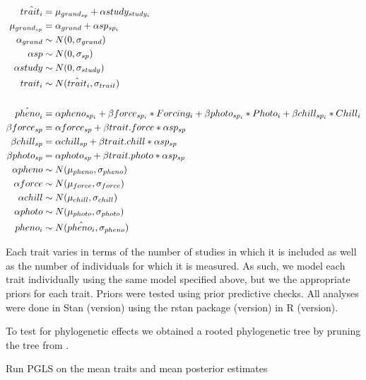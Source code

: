 \documentclass{article}\usepackage[]{graphicx}\usepackage[]{color}
\begin{document}
\begin{align*}
\hat{trait_i} &= \mu_{grand_{sp}} + \alpha study_{study_i} \\
\mu_{grand_{sp}} &= \alpha_{grand} + \alpha sp_{sp_i} \\
\alpha_{grand}  & \sim N(0, \sigma_{grand})\\
\alpha sp & \sim N(0, \sigma_{sp}) \\
\alpha study& \sim N(0, \sigma_{study}) \\
trait_i & \sim N(\hat{trait}_i, \sigma_{trait}) \\
\vspace{1ex}\\
\hat{pheno}_i  &= \alpha pheno_{sp_i} + \beta force_{sp_i} * Forcing_{i} + \beta photo_{sp_i}  * Photo_{i} + \beta chill_{sp_i} * Chill_{i} \\
\beta force_{sp} &= \alpha force_{sp} + \beta trait.force * \alpha sp_{sp}\\
\beta chill_{sp} &= \alpha chill_{sp} + \beta trait.chill * \alpha sp_{sp}\\
\beta photo_{sp} &= \alpha photo_{sp} + \beta trait.photo * \alpha sp_{sp}\\
\alpha pheno & \sim N(\mu_{pheno}, \sigma_{pheno}) \\
\alpha force& \sim N(\mu_{force}, \sigma_{force}) \\
\alpha chill & \sim N(\mu_{chill}, \sigma_{chill}) \\
\alpha photo & \sim N(\mu_{photo}, \sigma_{photo}) \\
pheno_{i} & \sim N(\hat{pheno_i}, \sigma_{pheno}) \\
\end{align*}

Each trait varies in terms of the number of studies in which it is included as well as the number of individuals for which it is measured. As such, we model each trait individually using the same model specified above, but we the appropriate priors for each trait. Priors were tested using prior predictive checks. All analyses were done in Stan (version) using the rstan package (version) in R (version). 

To test for phylogenetic effects we obtained a rooted phylogenetic tree by pruning the tree from \citep{Smith2018}.

Run PGLS on the mean traits and mean posterior estimates 
\end{document}
